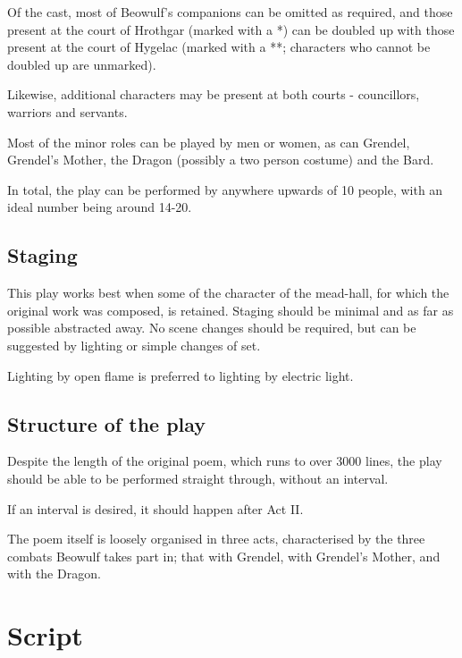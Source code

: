 \documentclass[a4paper]{article}
\begin{document}
Of the cast, most of Beowulf's companions can be omitted as required, and those
present at the court of Hrothgar (marked with a  *) can be doubled up with those present at the court
of Hygelac (marked with a **; characters who cannot be doubled up are unmarked).

Likewise, additional characters may be present at both courts - councillors, warriors and servants.

Most of the minor roles can be played by men or women, as can Grendel, Grendel's
Mother, the Dragon (possibly a two person costume) and the Bard.

In total, the play can be performed by anywhere upwards of 10 people, with an ideal number being around 14-20.

\subsection{Staging}%

This play works best when some of the character of the mead-hall, for which the
original work was composed, is retained. Staging should be minimal and as far as
possible abstracted away. No scene changes should be required, but can be suggested 
by lighting or simple changes of set.

Lighting by open flame is preferred to lighting by electric light.

\subsection{Structure of the play}%

Despite the length of the original poem, which runs to over 3000 lines, the play
should be able to be performed straight through, without an interval.

If an interval is desired, it should happen after Act II.

The poem itself is loosely organised in three acts, characterised by the three 
combats Beowulf takes part in; that with Grendel, with Grendel's Mother, and with the Dragon.

\newpage

\section{Script}
\end{document}
